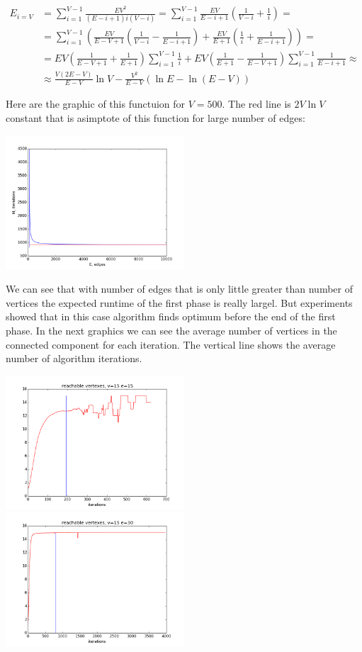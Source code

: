 \documentclass{llncs}
\begin{document}
  \begin{align*}
   E_{i=V} & = \sum_{i = 1}^{V - 1} \frac{EV^2}{(E - i + 1)i(V - i)} = \sum_{i = 1}^{V - 1} \frac{EV}{E - i  + 1} \left( \frac{1}{V - i} + \frac{1}{i}\right) = \\
	  & = \sum_{i = 1}^{V - 1} \left( \frac{EV}{E - V + 1} \left( \frac{1}{V - i} - \frac{1}{E - i + 1} \right) + \frac{EV}{E + 1} \left( \frac{1}{i} + \frac{1}{E - i + 1} \right) \right) = \\
	  & = EV \left( \frac{1}{E - V + 1} + \frac{1}{E + 1} \right) \sum_{i = 1}^{V - 1} \frac{1}{i} + EV \left( \frac{1}{E + 1} - \frac{1}{E - V + 1} \right) \sum_{i = 1}^{V - 1} \frac{1}{E - i + 1} \approx \\
	  & \approx \frac{V(2E - V)}{E - V} \ln{V} - \frac{V^2}{E - V} (\ln{E} - \ln{(E - V)} )
  \end{align*}
  
  Here are the graphic of this functuion for $V = 500$. The red line is $2V \ln{V}$ constant that is asimptote of this function for large number of edges:
  
  \includegraphics[height=5cm]{pic/Formula.png}
  
  We can see that with number of edges that is only little greater than number of vertices the expected runtime of the first phase is really largel. 
  But experiments showed that in this case algorithm finds optimum before the end of the first phase.
  In the next graphics we can see the average number of vertices in the connected component for each iteration. The vertical line shows the average number of algorithm iterations.
  
  \includegraphics[height=5cm]{pic/reachable_vertices_v15e15.png}
  \includegraphics[height=5cm]{pic/reachable_vertices_v15e30.png}
  
\end{document}

